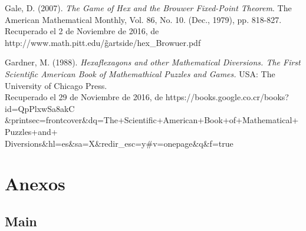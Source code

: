 \documentclass[12pt,letterpaper]{article}
\begin{document}
\begin{thebibliography}{1}
 Gale, D. (2007). \textit{The Game of Hex and the Brouwer Fixed-Point Theorem}. The American Mathematical Monthly, Vol. 86, No. 10. (Dec., 1979), pp. 818-827. Recuperado el 2 de Noviembre de 2016, de http://www.math.pitt.edu/\~gartside/hex\_Browuer.pdf

 Gardner, M. (1988). \textit{Hexaflexagons and other Mathematical Diversions. The First Scientific American Book of Mathemathical Puzzles and Games.} USA: The University of Chicago Press.\\Recuperado el 29 de Noviembre de 2016, de https://books.google.co.cr/books?id=QpPlxwSa8akC\\\&printsec=frontcover\&dq=The+Scientific+American+Book+of+Mathematical+Puzzles+and+\\Diversions\&hl=es\&sa=X\&redir\_esc=y\#v=onepage\&q\&f=true

\end{thebibliography}


\newpage

\section{Anexos}
\subsection{Main}
\end{document}
